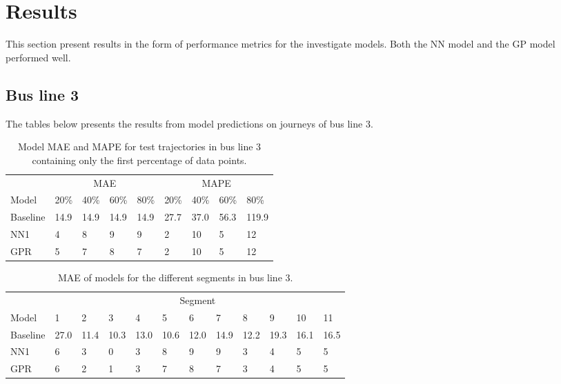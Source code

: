 
\captionsetup{width=.75\textwidth}


\chapter{Results}
\label{cha:results}
This section present results in the form of performance metrics for the investigate models. Both the NN model and the GP model performed well.

\section{Bus line 3}
The tables below presents the results from model predictions on journeys of bus line 3.
\begin{table}[H]
  \centering
  \caption{Model MAE and MAPE for test trajectories in bus line 3 containing only the first percentage of data points.}
  \label{tbl:models-mae-and-mape-203}
  \begin{tabular}{l | l | l | l | l || l | l | l | l }
    & \multicolumn{4}{c}{MAE} & \multicolumn{4}{c}{MAPE} \\
    Model      & 20\% & 40\% & 60\% & 80\% & 20\% & 40\% & 60\% & 80\% \\
    \hline
    Baseline & 14.9 & 14.9 & 14.9 & 14.9  & 27.7 & 37.0 & 56.3 & 119.9 \\
    NN1        & 4 &  8 & 9 &  9  & 2 & 10 & 5 & 12 \\
    GPR        & 5 &  7 & 8 &  7  & 2 & 10 & 5 & 12 \\
  \end{tabular}
\end{table}

\begin{table}[H]
  \centering
  \caption{MAE of models for the different segments in bus line 3.}
  \label{tbl:model-mae-of-segs-203}
  \begin{tabular}{ l | l | l | l | l | l | l | l | l | l | l | l }
    & \multicolumn{11}{c}{Segment} \\
    Model       & 1 & 2 & 3 & 4 & 5 & 6 & 7 & 8 & 9 & 10 & 11 \\
    \hline
    Baseline  & 27.0 & 11.4 & 10.3 & 13.0 & 10.6 & 12.0 & 14.9 & 12.2 & 19.3 & 16.1  & 16.5 \\
    NN1         & 6 & 3 & 0 & 3 &  8 & 9 &  9 & 3 & 4 & 5  & 5 \\
    GPR         & 6 & 2 & 1 & 3 &  7 & 8 &  7 & 3 & 4 & 5  & 5 \\
  \end{tabular}
\end{table}

